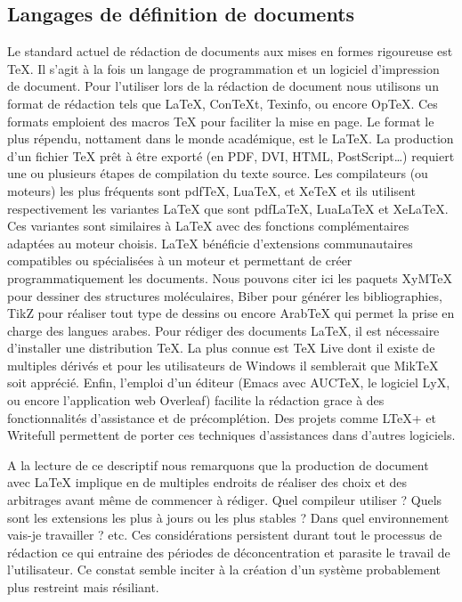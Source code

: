 \documentclass[a4paper,12pt]{article}
\begin{document}
\subsection{Langages de définition de documents}
\label{sec:org39da9f3}
Le standard actuel de rédaction de documents aux mises en formes rigoureuse est \TeX{}. Il s'agit à la fois un langage de programmation et un logiciel d'impression de document. Pour l'utiliser lors de la rédaction de document nous utilisons un format de rédaction tels que \LaTeX{}, ConTeXt, Texinfo, ou encore OpTeX. Ces formats emploient des macros \TeX{} pour faciliter la mise en page. Le format le plus répendu, nottament dans le monde académique, est le \LaTeX{}. La production d'un fichier \TeX{} prêt à être exporté (en PDF, DVI, HTML, PostScript\ldots{}) requiert une ou plusieurs étapes de compilation du texte source. Les compilateurs (ou moteurs) les plus fréquents sont pdfTeX, LuaTeX, et XeTeX et ils utilisent respectivement les variantes \LaTeX{} que sont pdfLaTeX, LuaLaTeX et XeLaTeX. Ces variantes sont similaires à \LaTeX{} avec des fonctions complémentaires adaptées au moteur choisis. \LaTeX{} bénéficie d'extensions communautaires compatibles ou spécialisées à un moteur et permettant de créer programmatiquement les documents. Nous pouvons citer ici les paquets XyMTeX pour dessiner des structures moléculaires, Biber pour générer les bibliographies, TikZ pour réaliser tout type de dessins ou encore ArabTeX qui permet la prise en charge des langues arabes. Pour rédiger des documents \LaTeX{}, il est nécessaire d'installer une distribution \TeX{}. La plus connue est \TeX{} Live dont il existe de multiples dérivés et pour les utilisateurs de Windows il semblerait que MikTeX soit apprécié. Enfin, l'emploi d'un éditeur (Emacs avec AUCTeX, le logiciel LyX, ou encore l'application web Overleaf) facilite la rédaction grace à des fonctionnalités d'assistance et de précomplétion. Des projets comme LTeX+\autocite{LtexplusLtexlsplus2025}  et Writefull\autocite{Writefull} permettent de porter ces techniques d'assistances dans d'autres logiciels.

A la lecture de ce descriptif nous remarquons que la production de document avec \LaTeX{} implique en de multiples endroits de réaliser des choix et des arbitrages avant même de commencer à rédiger. Quel compileur utiliser ? Quels sont les extensions les plus à jours ou les plus stables ? Dans quel environnement vais-je travailler ? etc. Ces considérations persistent durant tout le processus de rédaction ce qui entraine des périodes de déconcentration et parasite le travail de l'utilisateur. Ce constat semble inciter à la création d'un système probablement plus restreint mais résiliant. 
\end{document}

